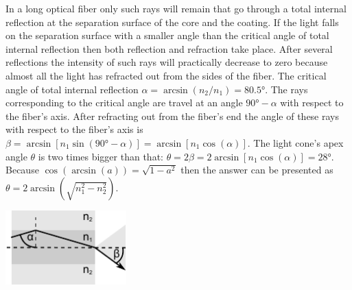 \documentclass[11pt]{article}
\begin{document}
\solueng
In a long optical fiber only such rays will remain that go through a total internal reflection at the separation surface of the core and the coating. If the light falls on the separation surface with a smaller angle than the critical angle of total internal reflection then both reflection and refraction take place. After several reflections the intensity of such rays will practically decrease to zero because almost all the light has refracted out from the sides of the fiber. The critical angle of total internal reflection $\alpha=\arcsin(n_2/n_1)=\ang{80,5}$. The rays corresponding to the critical angle are travel at an angle $\ang{90}-\alpha$ with respect to the fiber’s axis. After refracting out from the fiber’s end the angle of these rays with respect to the fiber’s axis is $\beta=\arcsin[n_1\sin(\ang{90}-\alpha)]=\arcsin[n_1\cos(\alpha)]$. The light cone’s apex angle $\theta$ is two times bigger than that: $\theta=2\beta=2\arcsin[n_1\cos(\alpha)]=\ang{28}$. Because $\cos(\arcsin(a))=\sqrt{1-a^2}$ then the answer can be presented as $\theta=2\arcsin(\sqrt{n_1^2-n_2^2})$.
\begin{center}
    \includegraphics[width=0.35\textwidth]{2016-lahg-04-kiud}
\end{center}
\probend
\bigskip

\end{document}
